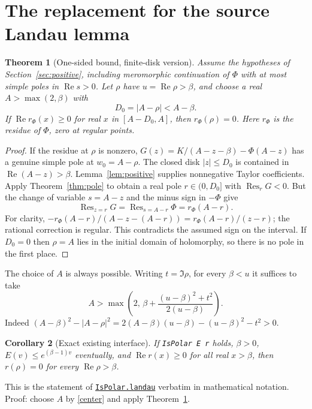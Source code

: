 \documentclass[11pt]{article}
\newtheorem{theorem}{Theorem}[section]
\newtheorem{corollary}[theorem]{Corollary}
\theoremstyle{remark}\newtheorem{remark}[theorem]{Remark}
\newcommand{\res}{\operatorname{Res}}\newcommand{\ord}{\operatorname{ord}}
\newcommand{\Rea}{\operatorname{Re}}\newcommand{\abs}[1]{\left|#1\right|}
\newcommand{\repo}{https://github.com/VladimirReshetnikov/ProveIt/blob/ef7d441dcb37ea944b7ac15731bb766f2e1354ea/Analysis/GeneralizedRiemannHypothesis/}
\newcommand{\src}[3]{\href{\repo Lean/grh/src/#1.lean\#L#2}{#3}}
\begin{document}
\section{The replacement for the source Landau lemma}\label{sec:landau}
\begin{theorem}[One-sided bound, finite-disk version]\label{thm:local}
Assume the hypotheses of Section~\ref{sec:positive}, including meromorphic continuation of $\Phi$ with at most simple poles in $\Rea s>0$. Let $\rho$ have $u=\Rea\rho>\beta$, and choose a real $A>\max(2,\beta)$ with
\begin{equation}\label{geometry}
 D_0=|A-\rho|<A-\beta.
\end{equation}
If $\Rea r_\Phi(x)\ge0$ for real $x$ in $[A-D_0,A]$, then $r_\Phi(\rho)=0$. Here $r_\Phi$ is the residue of $\Phi$, zero at regular points.
\end{theorem}
\begin{proof}
If the residue at $\rho$ is nonzero, $G(z)=K/(A-z-\beta)-\Phi(A-z)$ has a genuine simple pole at $w_0=A-\rho$. The closed disk $|z|\le D_0$ is contained in $\Rea(A-z)>\beta$. Lemma~\ref{lem:positive} supplies nonnegative Taylor coefficients. Apply Theorem~\ref{thm:pole} to obtain a real pole $r\in(0,D_0]$ with $\res_rG<0$. But the change of variable $s=A-z$ and the minus sign in $-\Phi$ give
\begin{equation}\label{sign}
 \res_{z=r}G=\res_{s=A-r}\Phi=r_\Phi(A-r).
\end{equation}
For clarity, $-r_\Phi(A-r)/(A-z-(A-r))=r_\Phi(A-r)/(z-r)$; the rational correction is regular. This contradicts the assumed sign on the interval. If $D_0=0$ then $\rho=A$ lies in the initial domain of holomorphy, so there is no pole in the first place.
\end{proof}

The choice of $A$ is always possible. Writing $t=\Im\rho$, for every $\beta<u$ it suffices to take
\begin{equation}\label{center}
 A>\max\left(2,\,\beta+\frac{(u-\beta)^2+t^2}{2(u-\beta)}\right).
\end{equation}
Indeed $(A-\beta)^2-|A-\rho|^2=2(A-\beta)(u-\beta)-(u-\beta)^2-t^2>0$.
\begin{corollary}[Exact existing interface]\label{cor:landau}
If \texttt{IsPolar E r} holds, $\beta>0$, $E(v)\le e^{(\beta-1)v}$ eventually, and $\Rea r(x)\ge0$ for all real $x>\beta$, then $r(\rho)=0$ for every $\Rea\rho>\beta$.
\end{corollary}
This is the statement of \src{Lib/Analytic/Landau}{217}{\texttt{IsPolar.landau}} verbatim in mathematical notation. Proof: choose $A$ by \eqref{center} and apply Theorem~\ref{thm:local}.
\end{document}
